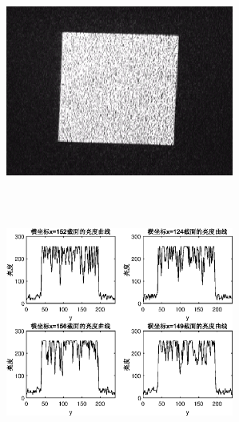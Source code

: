 \documentclass[UTF8]{ctexart}
\makeatletter
\newcommand{\figcaption}{\def\@captype{figure}\caption}
\makeatother
\begin{document}
\begin{center}
			\includegraphics[width=7.5cm,height=7.5cm]{YUANaddDOEangel4.eps}
			\includegraphics[width=7.5cm,height=7.5cm]{addDOEangel4.eps}
			\figcaption{加DOE的CCD捕捉图和光亮度曲线(角度4)}\label{addDOEangel4}
			

\end{center}
\end{document}
